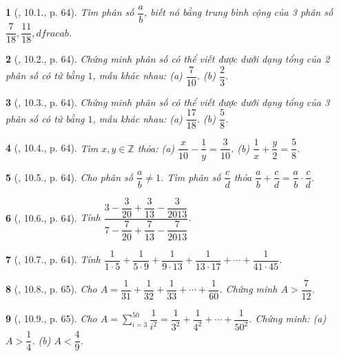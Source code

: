 \documentclass{article}
\newtheorem{baitoan}{}
\begin{document}
\begin{baitoan}[\cite{TLCT_THCS_Toan_6_so_hoc}, 10.1., p. 64]
	Tìm phân số $\dfrac{a}{b}$, biết nó bằng trung bình cộng của 3 phân số $\dfrac{7}{18},\dfrac{11}{18},dfrac{a}{b}$.
\end{baitoan}

\begin{baitoan}[\cite{TLCT_THCS_Toan_6_so_hoc}, 10.2., p. 64]
	Chứng minh phân số có thể viết được dưới dạng tổng của 2 phân số có tử bằng $1$, mẫu khác nhau: (a) $\dfrac{7}{10}$. (b) $\dfrac{2}{3}$.
\end{baitoan}

\begin{baitoan}[\cite{TLCT_THCS_Toan_6_so_hoc}, 10.3., p. 64]
	Chứng minh phân số có thể viết được dưới dạng tổng của 3 phân số có tử bằng $1$, mẫu khác nhau: (a) $\dfrac{17}{18}$. (b) $\dfrac{5}{8}$.
\end{baitoan}

\begin{baitoan}[\cite{TLCT_THCS_Toan_6_so_hoc}, 10.4., p. 64]
	Tìm $x,y\in\mathbb{Z}$ thỏa: (a) $\dfrac{x}{10} - \dfrac{1}{y} = \dfrac{3}{10}$. (b) $\dfrac{1}{x} + \dfrac{y}{2} = \dfrac{5}{8}$. 
\end{baitoan}

\begin{baitoan}[\cite{TLCT_THCS_Toan_6_so_hoc}, 10.5., p. 64]
	Cho phân số $\dfrac{a}{b}\ne1$. Tìm phân số $\dfrac{c}{d}$ thỏa $\dfrac{a}{b} + \dfrac{c}{d} = \dfrac{a}{b}\cdot\dfrac{c}{d}$.
\end{baitoan}

\begin{baitoan}[\cite{TLCT_THCS_Toan_6_so_hoc}, 10.6., p. 64]
	Tính $\dfrac{3 - \dfrac{3}{20} + \dfrac{3}{13} - \dfrac{3}{2013}}{7 - \dfrac{7}{20} + \dfrac{7}{13} - \dfrac{7}{2013}}$.
\end{baitoan}

\begin{baitoan}[\cite{TLCT_THCS_Toan_6_so_hoc}, 10.7., p. 64]
	Tính $\dfrac{1}{1\cdot5} + \dfrac{1}{5\cdot9} + \dfrac{1}{9\cdot13} + \dfrac{1}{13\cdot17} + \cdots + \dfrac{1}{41\cdot45}$.
\end{baitoan}

\begin{baitoan}[\cite{TLCT_THCS_Toan_6_so_hoc}, 10.8., p. 65]
	Cho $A = \dfrac{1}{31} + \dfrac{1}{32} + \dfrac{1}{33} + \cdots + \dfrac{1}{60}$. Chứng minh $A > \dfrac{7}{12}$.
\end{baitoan}

\begin{baitoan}[\cite{TLCT_THCS_Toan_6_so_hoc}, 10.9., p. 65]
	Cho $A = \sum_{i=3}^{50} \dfrac{1}{i^2} = \dfrac{1}{3^2} + \dfrac{1}{4^2} + \cdots + \dfrac{1}{50^2}$. Chứng minh: (a) $A > \dfrac{1}{4}$. (b) $A < \dfrac{4}{9}$.
\end{baitoan}
\end{document}
